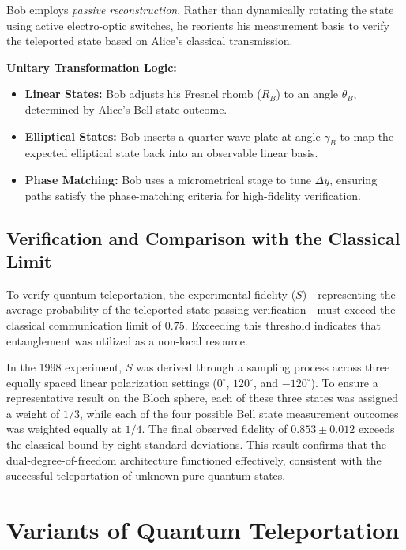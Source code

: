 \documentclass[aps,prd,preprint,floats,epsf,superscriptaddress,nofootinbib]{revtex4}
\begin{document}
Bob employs \textit{passive reconstruction}. Rather than dynamically rotating the state using active electro-optic switches, he reorients his measurement basis to verify the teleported state based on Alice's classical transmission.

\textbf{Unitary Transformation Logic:}
\begin{itemize}
    \item \textbf{Linear States:} Bob adjusts his Fresnel rhomb ($R_B$) to an angle $\theta_B$, determined by Alice’s Bell state outcome.
    \item \textbf{Elliptical States:} Bob inserts a quarter-wave plate at angle $\gamma_B$ to map the expected elliptical state back into an observable linear basis.
    \item \textbf{Phase Matching:} Bob uses a micrometrical stage to tune $\Delta y$, ensuring paths satisfy the phase-matching criteria for high-fidelity verification.
\end{itemize}

\subsection{Verification and Comparison with the Classical Limit}
To verify quantum teleportation, the experimental fidelity ($S$)---representing the average probability of the teleported state passing verification---must exceed the classical communication limit of $0.75$. Exceeding this threshold indicates that entanglement was utilized as a non-local resource.

In the 1998 experiment, $S$ was derived through a sampling process across three equally spaced linear polarization settings ($0^\circ$, $120^\circ$, and $-120^\circ$). To ensure a representative result on the Bloch sphere, each of these three states was assigned a weight of $1/3$, while each of the four possible Bell state measurement outcomes was weighted equally at $1/4$. The final observed fidelity of $0.853 \pm 0.012$ exceeds the classical bound by eight standard deviations. This result confirms that the dual-degree-of-freedom architecture functioned effectively, consistent with the successful teleportation of unknown pure quantum states.
\label{sec:Experimental Implementation}



\section{Variants of Quantum Teleportation}
\end{document}
